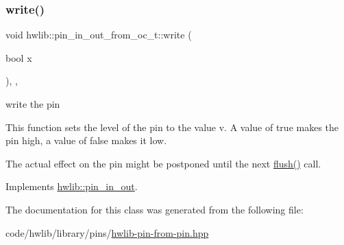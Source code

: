 \subsubsection{\texorpdfstring{write()}{write()}}
{\footnotesize\ttfamily void hwlib\+::pin\+\_\+in\+\_\+out\+\_\+from\+\_\+oc\+\_\+t\+::write (\begin{DoxyParamCaption}\item[{bool}]{x }\end{DoxyParamCaption})\hspace{0.3cm}{\ttfamily [inline]}, {\ttfamily [override]}, {\ttfamily [virtual]}}

write the pin

This function sets the level of the pin to the value v. A value of true makes the pin high, a value of false makes it low.

The actual effect on the pin might be postponed until the next \hyperlink{classhwlib_1_1pin__in__out__from__oc__t_a69c975d51ed408a8abb62924c59e9cdb}{flush()} call. 

Implements \hyperlink{classhwlib_1_1pin__in__out_aa5e2adcb5707f86c20b6306fc09f1582}{hwlib\+::pin\+\_\+in\+\_\+out}.



The documentation for this class was generated from the following file\+:\begin{DoxyCompactItemize}
\item 
code/hwlib/library/pins/\hyperlink{hwlib-pin-from-pin_8hpp}{hwlib-\/pin-\/from-\/pin.\+hpp}\end{DoxyCompactItemize}
